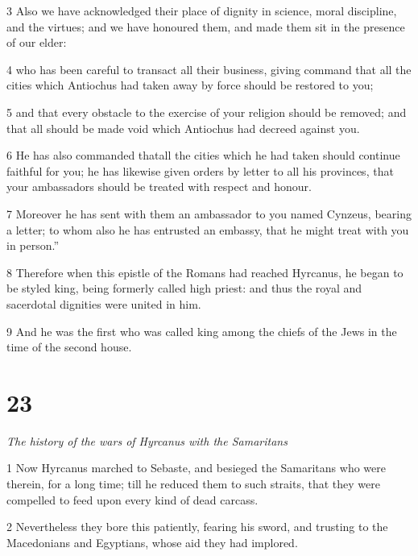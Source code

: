 \par 3 Also we have acknowledged their place of dignity in science, moral discipline, and the virtues; and we have honoured them, and made them sit in the presence of our elder: 

\par 4 who has been careful to transact all their business, giving command that all the cities which Antiochus had taken away by force should be restored to you; 

\par 5 and that every obstacle to the exercise of your religion should be removed; and that all should be made void which Antiochus had decreed against you. 

\par 6 He has also commanded thatall the cities which he had taken should continue faithful for you; he has likewise given orders by letter to all his provinces, that your ambassadors should be treated with respect and honour. 

\par 7 Moreover he has sent with them an ambassador to you named Cynzeus, bearing a letter; to whom also he has entrusted an embassy, that he might treat with you in person.” 

\par 8 Therefore when this epistle of the Romans had reached Hyrcanus, he began to be styled king, being formerly called high priest: and thus the royal and sacerdotal dignities were united in him. 

\par 9 And he was the first who was called king among the chiefs of the Jews in the time of the second house.


\chapter{23}

\par \textit{The history of the wars of Hyrcanus with the Samaritans}

\par 1 Now Hyrcanus marched to Sebaste, and besieged the Samaritans who were therein, for a long time; till he reduced them to such straits, that they were compelled to feed upon every kind of dead carcass. 

\par 2 Nevertheless they bore this patiently, fearing his sword, and trusting to the Macedonians and Egyptians, whose aid they had implored. 

